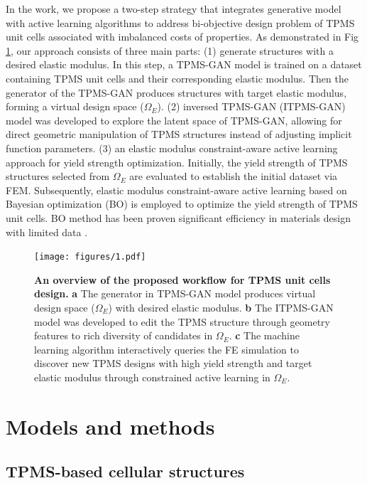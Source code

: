 \documentclass[preprint,review,12pt,authoryear]{elsarticle}
\begin{document}
In the work, we propose a two-step strategy that integrates generative model with active learning algorithms to address bi-objective design problem of TPMS unit cells associated with imbalanced costs of properties. As demonstrated in Fig \ref{fig:1}, our approach consists of three main parts: (1) generate structures with a desired elastic modulus. In this step, a TPMS-GAN model is trained on a dataset containing TPMS unit cells and their corresponding elastic modulus. Then the generator of the TPMS-GAN produces structures with target elastic modulus, forming a virtual design space ($\Omega_E$). (2) inversed TPMS-GAN (ITPMS-GAN) model was developed to explore the latent space of TPMS-GAN, allowing for direct geometric manipulation of TPMS structures instead of adjusting implicit function parameters. (3) an elastic modulus constraint-aware active learning approach for yield strength optimization. Initially, the yield strength of TPMS structures selected from $\Omega_E$ are evaluated to establish the initial dataset via FEM. Subsequently, elastic modulus constraint-aware active learning based on Bayesian optimization (BO) is employed to optimize the yield strength of TPMS unit cells. BO method has been proven significant efficiency in materials design with limited data \citep{Ma2024b,Cao2024a,Tian2024a}.

\begin{figure}
    \centering
    \texttt{[image: figures/1.pdf]}
    \caption{\textbf{An overview of the proposed workflow for TPMS unit cells design.} \textbf{a} The generator in TPMS-GAN model produces virtual design space ($\Omega_E$) with desired elastic modulus. \textbf{b} The ITPMS-GAN model was developed to edit the TPMS structure through geometry features to rich diversity of candidates in $\Omega_E$. \textbf{c} The machine learning algorithm interactively queries the FE simulation to discover new TPMS designs with high yield strength and target elastic modulus through constrained active learning in $\Omega_E$.}
    \label{fig:1}
\end{figure}

\section{Models and methods}

\subsection{TPMS-based cellular structures}
\end{document}
